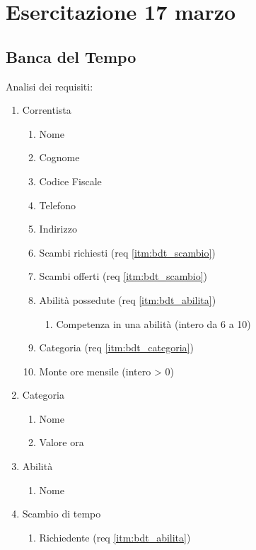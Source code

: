\section{Esercitazione 17 marzo}

\subsection{Banca del Tempo}

Analisi dei requisiti:
\begin{enumerate}
    \item Correntista
    \begin{enumerate}
        \item Nome
        \item Cognome
        \item Codice Fiscale
        \item Telefono
        \item Indirizzo
        \item Scambi richiesti (req \ref{itm:bdt_scambio})
        \item Scambi offerti (req \ref{itm:bdt_scambio})
        \item Abilit\`a possedute (req \ref{itm:bdt_abilita})
        \begin{enumerate}
            \item Competenza in una abilit\`a (intero da 6 a 10)
        \end{enumerate}
        \item Categoria (req \ref{itm:bdt_categoria})
        \item Monte ore mensile (intero > 0)
    \end{enumerate}
    \item \label{itm:bdt_categoria} Categoria
    \begin{enumerate}
        \item Nome
        \item Valore ora
    \end{enumerate}
    \item \label{itm:bdt_abilita} Abilit\`a
    \begin{enumerate}
        \item Nome
    \end{enumerate}
    \item \label{itm:bdt_scambio} Scambio di tempo
    \begin{enumerate}
        \item Richiedente (req \ref{itm:bdt_abilita})

\end{enumerate}
\end{enumerate}
